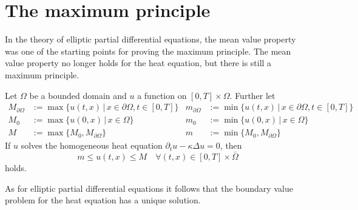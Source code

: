 %
%
%
\section{The maximum principle}
In the theory of elliptic partial differential equations, the mean
value property was one of the starting points for proving the
maximum principle.
The mean value property no longer holds for the heat equation,
but there is still a maximum principle.

\begin{satz}
Let $\Omega$ be a bounded domain and 
$u$ a function on $[0,T]\times\Omega$.
Further let
\begin{align*}
M_{\partial \Omega}&:=\max\{u(t,x)\,|\,x\in\partial\Omega, t\in[0,T]\}
&
m_{\partial \Omega}&:=\min\{u(t,x)\,|\,x\in\partial\Omega, t\in[0,T]\}
\\
M_0&:=
\max\{u(0,x)\,|\,x\in\Omega\}
&
m_0&:=
\min\{u(0,x)\,|\,x\in\Omega\}
\\
M&:=\max\{M_0,M_{\partial\Omega}\}
&
m&:=\min\{M_0,M_{\partial\Omega}\}
\end{align*}
If $u$ solves the homogeneous heat equation 
$\partial_tu-\kappa\Delta u=0$,
then
\[
m\le u(t,x)\le M\quad\forall(t,x)\in[0,T]\times\bar\Omega
\]
holds.
\end{satz}
As for elliptic partial differential equations it follows that
the boundary value problem for the heat equation has a unique solution.

